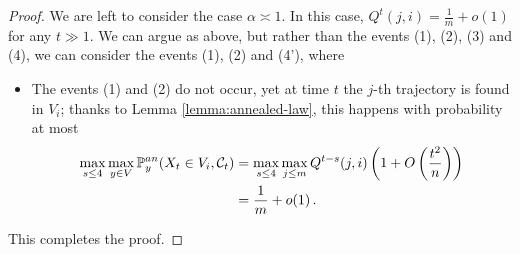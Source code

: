 \documentclass[10pt,a4paper]{amsart}
\newcommand{\p}{\mathbb{P}}
\newcommand{\pan}{\p^{\textup{an}}}
\newcommand{\semi}{{Q}}
\begin{document}
\begin{proof}
			 We are left to consider the case $\alpha\asymp 1$. In this case, $Q^t(j,i)=\frac1m+o(1)$ for any $t\gg1$. We can argue as above, but rather than the events (1), (2), (3) and (4), we can consider the events (1), (2) and (4'), where
			 \begin{itemize}
			 	\item[(4')] The events (1) and (2) do not occur, yet at time $t$ the $j$-th trajectory is found in $V_i$; thanks to Lemma \ref{lemma:annealed-law}, this happens with probability at most
			 	\begin{align*}
			 		\max_{s\le 4}\max_{y\in V}\pan_y(X_{t}\in V_i,\mathcal{C}_{t})&=\max_{s\le 4}\max_{j \le m}\semi^{t-s}(j,i)\left(1+O\left(\frac{t^2}n\right)\right)\\
			 		&=\frac1m+o(1)\,.
			 	\end{align*}
			 \end{itemize}
			 This completes the proof.
		\end{proof}
\end{document}
